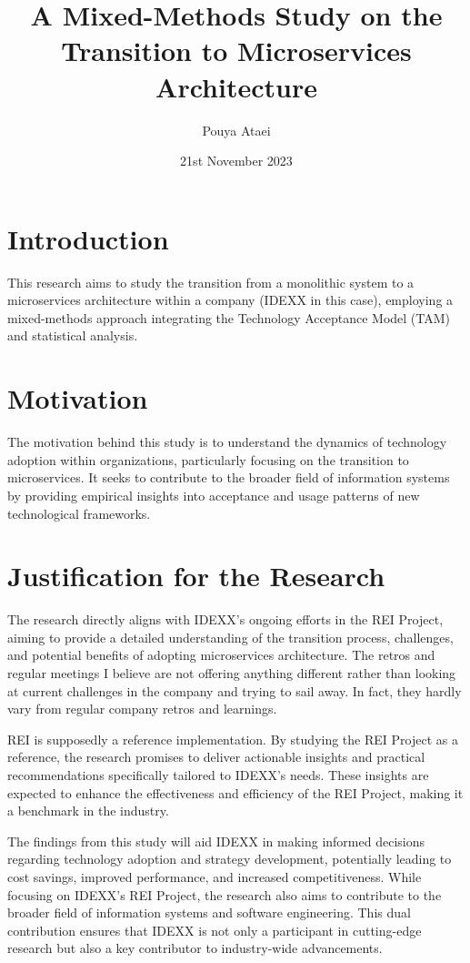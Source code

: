\documentclass{article}
\title{A Mixed-Methods Study on the Transition to Microservices Architecture}
\author{Pouya Ataei}
\date{21st November 2023}
\begin{document}
\maketitle

\section{Introduction}
\label{sec:introduction}

This research aims to study the transition from a monolithic system to a microservices architecture within a company (IDEXX in this case), employing a mixed-methods approach integrating the Technology Acceptance Model (TAM) and statistical analysis.

\section{Motivation}
\label{sec:motivation}

The motivation behind this study is to understand the dynamics of technology adoption within organizations, particularly focusing on the transition to microservices. It seeks to contribute to the broader field of information systems by providing empirical insights into acceptance and usage patterns of new technological frameworks.


\section{Justification for the Research}

The research directly aligns with IDEXX's ongoing efforts in the REI Project, aiming to provide a detailed understanding of the transition process, challenges, and potential benefits of adopting microservices architecture. The retros and regular meetings I believe are not offering anything different rather than looking at current challenges in the company and trying to sail away. In fact, they hardly vary from regular company retros and learnings.

REI is supposedly a reference implementation. By studying the REI Project as a reference, the research promises to deliver actionable insights and practical recommendations specifically tailored to IDEXX's needs. These insights are expected to enhance the effectiveness and efficiency of the REI Project, making it a benchmark in the industry.

The findings from this study will aid IDEXX in making informed decisions regarding technology adoption and strategy development, potentially leading to cost savings, improved performance, and increased competitiveness. While focusing on IDEXX's REI Project, the research also aims to contribute to the broader field of information systems and software engineering. This dual contribution ensures that IDEXX is not only a participant in cutting-edge research but also a key contributor to industry-wide advancements.
\end{document}
